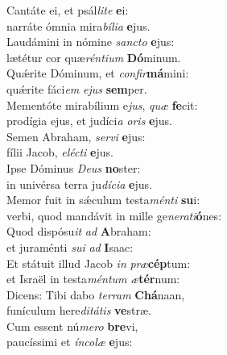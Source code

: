 \evenverse Cantáte ei, et psál\textit{li}\textit{te} \textbf{e}i:~\*\\
\evenverse narráte ómnia mira\textit{bí}\textit{li}\textit{a} \textbf{e}jus.\\
\oddverse Laudámini in nómine \textit{san}\textit{cto} \textbf{e}jus:~\*\\
\oddverse lætétur cor quæ\textit{rén}\textit{ti}\textit{um} \textbf{Dó}minum.\\
\evenverse Quǽrite Dóminum, et \textit{con}\textit{fir}\textbf{má}mini:~\*\\
\evenverse quǽrite fáci\textit{em} \textit{e}\textit{jus} \textbf{sem}per.\\
\oddverse Mementóte mirabílium e\textit{jus}, \textit{quæ} \textbf{fe}cit:~\*\\
\oddverse prodígia ejus, et judíci\textit{a} \textit{o}\textit{ris} \textbf{e}jus.\\
\evenverse Semen Abraham, \textit{ser}\textit{vi} \textbf{e}jus:~\*\\
\evenverse fílii Jacob, \textit{e}\textit{lé}\textit{cti} \textbf{e}jus.\\
\oddverse Ipse Dóminus \textit{De}\textit{us} \textbf{no}ster:~\*\\
\oddverse in univérsa terra ju\textit{dí}\textit{ci}\textit{a} \textbf{e}jus.\\
\evenverse Memor fuit in sǽculum testa\textit{mén}\textit{ti} \textbf{su}i:~\*\\
\evenverse verbi, quod mandávit in mille ge\textit{ne}\textit{ra}\textit{ti}\textbf{ó}nes:\\
\oddverse Quod dispósu\textit{it} \textit{ad} \textbf{A}braham:~\*\\
\oddverse et juraménti \textit{su}\textit{i} \textit{ad} \textbf{I}saac:\\
\evenverse Et státuit illud Jacob \textit{in} \textit{præ}\textbf{cép}tum:~\*\\
\evenverse et Israël in testa\textit{mén}\textit{tum} \textit{æ}\textbf{tér}num:\\
\oddverse Dicens: Tibi dabo \textit{ter}\textit{ram} \textbf{Chá}naan,~\*\\
\oddverse funículum here\textit{di}\textit{tá}\textit{tis} \textbf{ve}stræ.\\
\evenverse Cum essent nú\textit{me}\textit{ro} \textbf{bre}vi,~\*\\
\evenverse paucíssimi et \textit{ín}\textit{co}\textit{læ} \textbf{e}jus:\\
